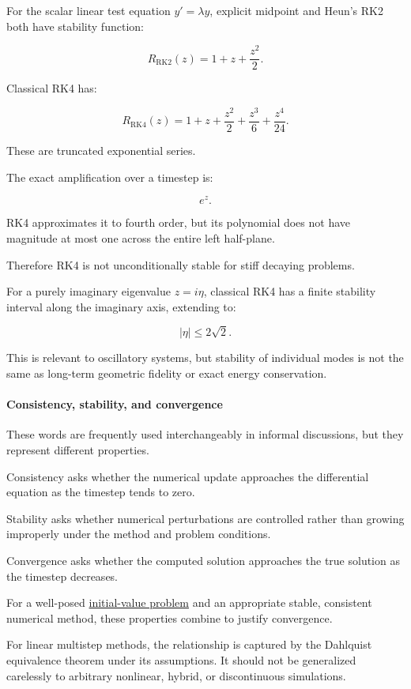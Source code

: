 For the scalar linear test equation \(y'=\lambda y\), explicit midpoint and Heun's RK2 both have stability function:

\[
\boxed{ R_{\mathrm{RK2}}(z)=1+z+\frac{z^2}{2} }.
\]

Classical RK4 has:

\[
\boxed{ R_{\mathrm{RK4}}(z)= 1+z+\frac{z^2}{2} +\frac{z^3}{6} +\frac{z^4}{24} }.
\]

These are truncated exponential series.

The exact amplification over a timestep is:

\[
e^z.
\]

RK4 approximates it to fourth order, but its polynomial does not have magnitude at most one across the entire left half-plane.

Therefore RK4 is not unconditionally stable for stiff decaying problems.

For a purely imaginary eigenvalue \(z=i\eta\), classical RK4 has a finite stability interval along the imaginary axis, extending to:

\[
|\eta|\le2\sqrt2.
\]

This is relevant to oscillatory systems, but stability of individual modes is not the same as long-term geometric fidelity or exact energy conservation.

\paragraph{Consistency, stability, and convergence}\label{02-foundations-ii-ch025-consistency-stability-and-convergence}

These words are frequently used interchangeably in informal discussions, but they represent different properties.

Consistency asks whether the numerical update approaches the differential equation as the timestep tends to zero.

Stability asks whether numerical perturbations are controlled rather than growing improperly under the method and problem conditions.

Convergence asks whether the computed solution approaches the true solution as the timestep decreases.

For a well-posed \hyperref[02-foundations-ii-ch025-odes-and-numerical-simulation]{initial-value problem} and an appropriate stable, consistent numerical method, these properties combine to justify convergence.

For linear multistep methods, the relationship is captured by the Dahlquist equivalence theorem under its assumptions. It should not be generalized carelessly to arbitrary nonlinear, hybrid, or discontinuous simulations.

